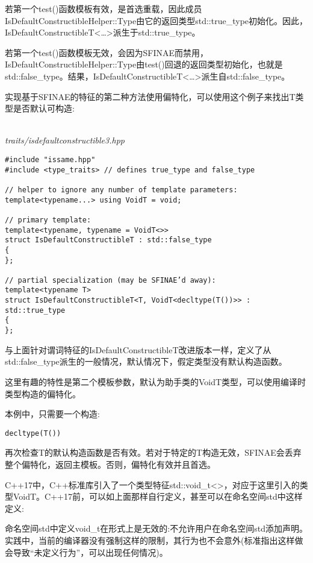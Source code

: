 若第一个test()函数模板有效，是首选重载，因此成员IsDefaultConstructibleHelper::Type由它的返回类型std::true\_type初始化。因此，IsDefaultConstructibleT<…>派生于std::true\_type。

若第一个test()函数模板无效，会因为SFINAE而禁用，IsDefaultConstructibleHelper::Type由test()回退的返回类型初始化，也就是std::false\_type。结果，IsDefaultConstructibleT<…>派生自std::false\_type。


实现基于SFINAE的特征的第二种方法使用偏特化，可以使用这个例子来找出T类型是否默认可构造:

\hspace*{\fill} \\ %
\noindent
\textit{traits/isdefaultconstructible3.hpp}
\begin{lstlisting}[style=styleCXX]
#include "issame.hpp"
#include <type_traits> // defines true_type and false_type

// helper to ignore any number of template parameters:
template<typename...> using VoidT = void;

// primary template:
template<typename, typename = VoidT<>>
struct IsDefaultConstructibleT : std::false_type
{
};

// partial specialization (may be SFINAE’d away):
template<typename T>
struct IsDefaultConstructibleT<T, VoidT<decltype(T())>> : std::true_type
{
};
\end{lstlisting}

与上面针对谓词特征的IsDefaultConstructibleT改进版本一样，定义了从std::false\_type派生的一般情况，默认情况下，假定类型没有默认构造函数。

这里有趣的特性是第二个模板参数，默认为助手类的VoidT类型，可以使用编译时类型构造的偏特化。

本例中，只需要一个构造:

\begin{lstlisting}[style=styleCXX]
decltype(T())
\end{lstlisting}

再次检查T的默认构造函数是否有效。若对于特定的T构造无效，SFINAE会丢弃整个偏特化，返回主模板。否则，偏特化有效并且首选。

C++17中，C++标准库引入了一个类型特征std::void\_t<>，对应于这里引入的类型VoidT。C++17前，可以如上面那样自行定义，甚至可以在命名空间std中这样定义:

\begin{tcolorbox}[colback=webgreen!5!white,colframe=webgreen!75!black]
\hspace*{0.75cm}命名空间std中定义void\_t在形式上是无效的:不允许用户在命名空间std添加声明。实践中，当前的编译器没有强制这样的限制，其行为也不会意外(标准指出这样做会导致“未定义行为”，可以出现任何情况)。
\end{tcolorbox}

